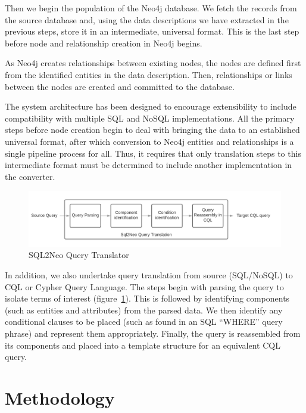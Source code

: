 \documentclass[12pt]{article}
\newcommand{\sectionfontstyle}{\fontsize{16pt}{1em}\usefont{T1}{phv}{b}{n}}
\begin{document}
    Then we begin the population of the Neo4j database. We fetch the records from the source database and, using the data descriptions we have extracted in the previous steps, store it in an intermediate, universal format. This is the last step before node and relationship creation in Neo4j begins.
    
    As Neo4j creates relationships between existing nodes, the nodes are defined first from the identified entities in the data description. Then, relationships or links between the nodes are created and committed to the database.
    
    The system architecture has been designed to encourage extensibility to include compatibility with multiple SQL and NoSQL implementations. All the primary steps before node creation begin to deal with bringing the data to an established universal format, after which conversion to Neo4j entities and relationships is a single pipeline process for all. Thus, it requires that only translation steps to this intermediate format must be determined to include another implementation in the converter.
    
    \begin{figure}[htb!]
        \centering
        \includegraphics[width=155mm]{img/sql2neo_query.png}
        \caption{SQL2Neo Query Translator}
        \label{fig:sql2neo_query}
    \end{figure}

    In addition, we also undertake query translation from source (SQL/NoSQL) to CQL or Cypher Query Language. The steps begin with parsing the query to isolate terms of interest (figure~\ref{fig:sql2neo_query}). This is followed by identifying components (such as entities and attributes) from the parsed data. We then identify any conditional clauses to be placed (such as found in an SQL ``WHERE'' query phrase) and represent them appropriately. Finally, the query is reassembled from its components and placed into a template structure for an equivalent CQL query.

    \newpage

    \section{\sectionfontstyle Methodology}
\end{document}

